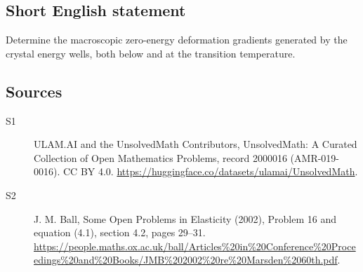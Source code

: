 \documentclass[11pt]{article}
\begin{document}
\subsection{Short English statement}
Determine the macroscopic zero-energy deformation gradients generated by the crystal energy wells, both below and at the transition temperature.
\subsection{Sources}
\begin{description}
\item[\hypertarget{source:2000016:1}{S1}] ULAM.AI and the UnsolvedMath Contributors, UnsolvedMath: A Curated Collection of Open Mathematics Problems, record 2000016 (AMR-019-0016). CC BY 4.0. \url{https://huggingface.co/datasets/ulamai/UnsolvedMath}.
\item[\hypertarget{source:2000016:2}{S2}] J. M. Ball, Some Open Problems in Elasticity (2002), Problem 16 and equation (4.1), section 4.2, pages 29–31. \url{https://people.maths.ox.ac.uk/ball/Articles%20in%20Conference%20Proceedings%20and%20Books/JMB%202002%20re%20Marsden%2060th.pdf}.
\end{description}
\label{end:2000016}
\end{document}
